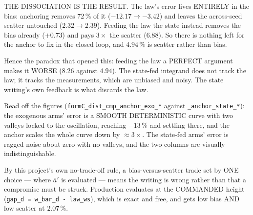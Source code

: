 \documentclass[11pt,a4paper,fontset=none]{ctexart}
\newcommand{\ba}{\bar{a}}
\begin{document}
THE DISSOCIATION IS THE RESULT. The law's error lives ENTIRELY in the bias:
anchoring removes $72\,\%$ of it ($-12.17 \to -3.42$) and leaves the across-seed
scatter untouched ($2.32 \to 2.39$). Feeding the law the state instead removes
the bias already ($+0.73$) and pays $3\times$ the scatter ($6.88$). So there is
nothing left for the anchor to fix in the closed loop, and $4.94\,\%$ is scatter
rather than bias.

Hence the paradox that opened this: feeding the law a PERFECT argument makes it
WORSE ($8.26$ against $4.94$). The state-fed integrand does not track the law;
it tracks the measurements, which are unbiased and noisy. The state writing's
own feedback is what discards the law.

Read off the figures (\texttt{formC\_dist\_cmp\_anchor\_exo\_*} against
\texttt{\_anchor\_state\_*}): the exogenous arms' error is a SMOOTH DETERMINISTIC
curve with two valleys locked to the oscillation, reaching $-13\,\%$ and settling
there, and the anchor scales the whole curve down by $\approx 3\times$. The
state-fed arms' error is ragged noise about zero with no valleys, and the two
columns are visually indistinguishable.

By this project's own no-trade-off rule, a bias-versus-scatter trade set by ONE
choice --- where $\ba'$ is evaluated --- means the writing is wrong rather than
that a compromise must be struck. Production evaluates at the COMMANDED height
(\texttt{gap\_d = w\_bar\_d - law\_ws}), which is exact and free, and gets low
bias AND low scatter at $2.07\,\%$.
\end{document}
